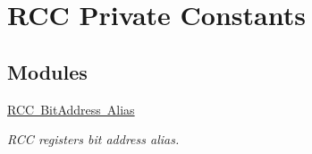 \hypertarget{group___r_c_c___private___constants}{}\section{R\+CC Private Constants}
\label{group___r_c_c___private___constants}
\subsection*{Modules}
\begin{DoxyCompactItemize}
\item 
\mbox{\hyperlink{group___r_c_c___bit_address___alias}{R\+C\+C Bit\+Address Alias}}
\begin{DoxyCompactList}\small\item\em R\+CC registers bit address alias. \end{DoxyCompactList}\end{DoxyCompactItemize}

